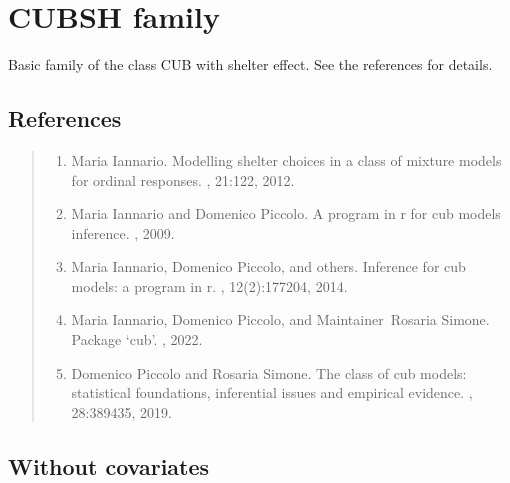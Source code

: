 \documentclass[letterpaper,10pt,english]{sphinxmanual}
\begin{document}
\noindent{}


\section{CUBSH family}
\label{\detokenize{manual:cubsh-family}}
\sphinxAtStartPar
Basic family of the class CUB with shelter effect.
See the references for details.


\subsection{References}
\label{\detokenize{manual:id38}}\begin{quote}
\begin{enumerate}
%
\setcounter{enumi}{0}
\item {} 
\sphinxAtStartPar
Maria Iannario. Modelling shelter choices in a class of mixture models for ordinal responses. , 21:1\textendash{}22, 2012.

\item {} 
\sphinxAtStartPar
Maria Iannario and Domenico Piccolo. A program in r for cub models inference. , 2009.

\item {} 
\sphinxAtStartPar
Maria Iannario, Domenico Piccolo, and others. Inference for cub models: a program in r. , 12(2):177\textendash{}204, 2014.

\item {} 
\sphinxAtStartPar
Maria Iannario, Domenico Piccolo, and Maintainer Rosaria Simone. Package ‘cub’. , 2022.

\item {} 
\sphinxAtStartPar
Domenico Piccolo and Rosaria Simone. The class of cub models: statistical foundations, inferential issues and empirical evidence. , 28:389\textendash{}435, 2019.

\end{enumerate}
\end{quote}


\subsection{Without covariates}
\label{\detokenize{manual:cubsh-without-covariates}}\label{\detokenize{manual:id76}}
\sphinxAtStartPar
{}
\end{document}
